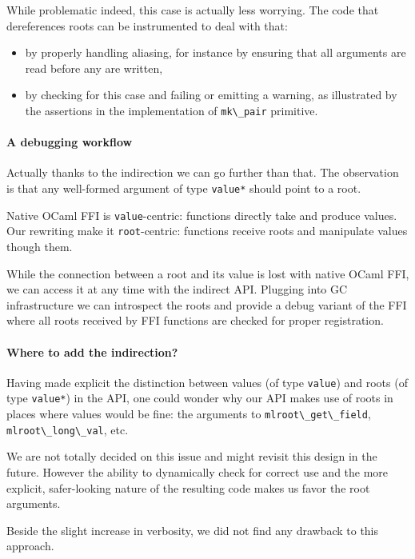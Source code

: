 \documentclass[a4paper]{easychair}
\newcommand{\cpp}[1]{\lstinline[style=C++]{#1}}
\begin{document}
While problematic indeed, this case is actually less worrying. The code
that dereferences roots can be instrumented to deal with that:
%
\begin{itemize}
\item by properly handling aliasing, for instance by ensuring that all
      arguments are read before any are written,
\item by checking for this case and failing or emitting a warning, as
      illustrated by the assertions in the implementation of
      \cpp{mk\_pair} primitive. 
\end{itemize}

\paragraph{A debugging workflow} Actually thanks to the indirection we can go
further than that. The observation is that any well-formed argument of type
\cpp{value*} should point to a root. 

Native OCaml FFI is \texttt{value}-centric: functions directly take and produce
values. Our rewriting make it \texttt{root}-centric: functions receive roots
and manipulate values though them.

While the connection between a root and its value is lost with native
OCaml FFI, we can access it at any time with the indirect API. Plugging
into GC infrastructure we can introspect the roots and provide a debug
variant of the FFI where all roots received by FFI functions are checked for
proper registration.

\paragraph{Where to add the indirection?}

Having made explicit the distinction between values (of type
\cpp{value}) and roots (of type \cpp{value*}) in the API, one
could wonder why our API makes use of roots in places where values would
be fine: the arguments to \cpp{mlroot\_get\_field}, \cpp{mlroot\_long\_val},
etc.

We are not totally decided on this issue and might revisit this design
in the future. However the ability to dynamically check for correct use
and the more explicit, safer-looking nature of the resulting code makes
us favor the root arguments.

Beside the slight increase in verbosity, we did not find any drawback to
this approach.
\end{document}
